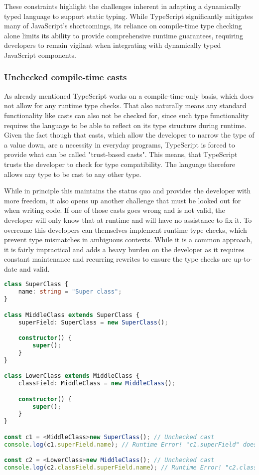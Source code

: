 These constraints highlight the challenges inherent in adapting a dynamically typed language to support static typing. While TypeScript significantly mitigates many of JavaScript’s shortcomings, its reliance on compile-time type checking alone limits its ability to provide comprehensive runtime guarantees, requiring developers to remain vigilant when integrating with dynamically typed JavaScript components.

\subsubsection{Unchecked compile-time casts}

As already mentioned TypeScript works on a compile-time-only basis, which does not allow for any runtime type checks. That also naturally means any standard functionality like casts can also not be checked for, since such type functionality requires the language to be able to reflect on its type structure during runtime. Given the fact though that casts, which allow the developer to narrow the type of a value down, are a necessity in everyday programs, TypeScript is forced to provide what can be called "trust-based casts". This means, that TypeScript trusts the developer to check for type compatibility. The language therefore allows any type to be cast to any other type.

While in principle this maintains the status quo and provides the developer with more freedom, it also opens up another challenge that must be looked out for when writing code. If one of those casts goes wrong and is not valid, the developer will only know that at runtime and will have no assistance to fix it. To overcome this developers can themselves implement runtime type checks, which prevent type mismatches in ambiguous contexts. While it is a common approach, it is fairly impractical and adds a heavy burden on the developer as it requires constant maintenance and recurring rewrites to ensure the type checks are up-to-date and valid.

\begin{lstlisting}[language=TypeScript,caption=Unchecked compile-time casts in TypeScript,label=lst:background:uncheckedcompilecasts]
class SuperClass {
	name: string = "Super class";
}

class MiddleClass extends SuperClass {
	superField: SuperClass = new SuperClass();

	constructor() {
		super();
	}
}

class LowerClass extends MiddleClass {
	classField: MiddleClass = new MiddleClass();

	constructor() {
		super();
	}
}

const c1 = <MiddleClass>new SuperClass(); // Unchecked cast
console.log(c1.superField.name); // Runtime Error! "c1.superField" does not actually exist

const c2 = <LowerClass>new MiddleClass(); // Unchecked cast
console.log(c2.classField.superField.name); // Runtime Error! "c2.classField.superField" does not actually exist
\end{lstlisting}

